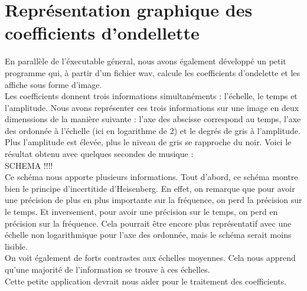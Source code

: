 \documentclass[a4paper,12pt]{article}
\begin{document}
\section{Représentation graphique des coefficients d'ondellette}
En parallèle de l'éxecutable géneral, nous avons également développé
un petit programme qui, à partir d'un fichier wav, calcule les
coefficients d'ondelette et les affiche sous forme d'image.\\
Les coefficients donnent trois informations simultanéments :
l'échelle, le temps et l'amplitude. Nous avons représenter ces trois
informations sur une image en deux dimenssions de la manière suivante
: l'axe des abscisse correspond au temps, l'axe des ordonnée à
l'échelle (ici en logarithme de 2) et le degrés de gris à l'amplitude. Plus
l'amplitude est élevée, plus le niveau de gris se rapproche du noir.
Voici le résultat obtenu avec quelques secondes de musique :\\
SCHEMA !!!!
\\
Ce schéma nous apporte plusieurs informations. Tout d'abord, ce schéma
montre bien le principe d'incertitide d'Heisenberg. En effet, on
remarque que pour avoir une précision de plus en plus importante sur
la fréquence, on perd la précision sur le temps. Et inversement, pour
avoir une précision sur le temps, on perd en précision sur la
fréquence. Cela pourrait être encore plus représentatif avec une
échelle non logarithmique pour l'axe des ordonnée, mais le schéma
serait moins lisible.\\
On voit également de forts contrastes aux échelles moyennes. Cela nous
apprend qu'une majorité de l'information se trouve à ces échelles.
\\
Cette petite application devrait nous aider pour le traitement des
coefficients.
\end{document}
